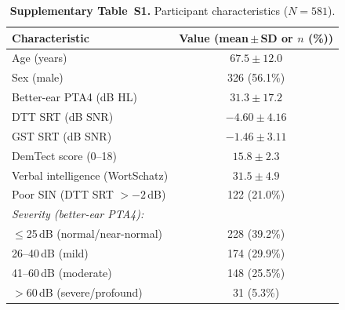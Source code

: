 \documentclass[12pt,a4paper]{article}
\begin{document}
\begin{table}[htbp]
\caption{\textbf{Supplementary Table~S1.} Participant characteristics
($N{=}581$).}
\label{tab:demo_supp}
\centering\small
\begin{tabular}{lc}
\toprule
Characteristic & Value (mean\,$\pm$\,SD or $n$ (\%)) \\
\midrule
Age (years)                      & $67.5 \pm 12.0$ \\
Sex (male)                       & 326 (56.1\%) \\
Better-ear PTA4 (dB HL)          & $31.3 \pm 17.2$ \\
DTT SRT (dB SNR)                 & $-4.60 \pm 4.16$ \\
GST SRT (dB SNR)                 & $-1.46 \pm 3.11$ \\
DemTect score (0--18)            & $15.8 \pm 2.3$ \\
Verbal intelligence (WortSchatz) & $31.5 \pm 4.9$ \\
Poor SIN (DTT SRT $>{-2}$\,dB)  & 122 (21.0\%) \\
\midrule
\multicolumn{2}{l}{\textit{Severity (better-ear PTA4):}} \\
$\leq$25\,dB (normal/near-normal) & 228 (39.2\%) \\
26--40\,dB (mild)                & 174 (29.9\%) \\
41--60\,dB (moderate)            & 148 (25.5\%) \\
$>$60\,dB (severe/profound)      & 31 (5.3\%) \\
\bottomrule
\end{tabular}
\end{table}
\end{document}
